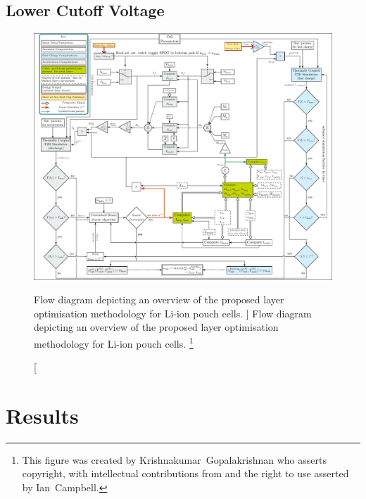 \subsection{Lower Cutoff Voltage}\label{sec:cutoff}
\begin{figure}[p]
    \begin{minipage}[t]{\textwidth}
        \centering
        \includegraphics[angle=90, width=\textwidth]{fig_master_flow_diagram}
        \captionsetup{labelsep=note}
        \caption
        [%
        Flow diagram depicting an overview of the proposed layer optimisation methodology
        for Li-ion pouch cells.
        ]%
        {%
            Flow diagram depicting an overview of the proposed layer optimisation methodology
            for Li-ion pouch cells.
        }%
        \label{fig:fig_strategy_schematic}
        \mpfootnotes[1]
        \vspace*{0.7225cm}
        \footnote{This figure was created by \mbox{Krishnakumar Gopalakrishnan} who
            asserts copyright, with intellectual contributions from and the right to
        use asserted by \mbox{Ian Campbell}.}
    \end{minipage}
\end{figure}
\afterpage{\clearpage}

\section{Results}\label{sec:resultslayeropt}

